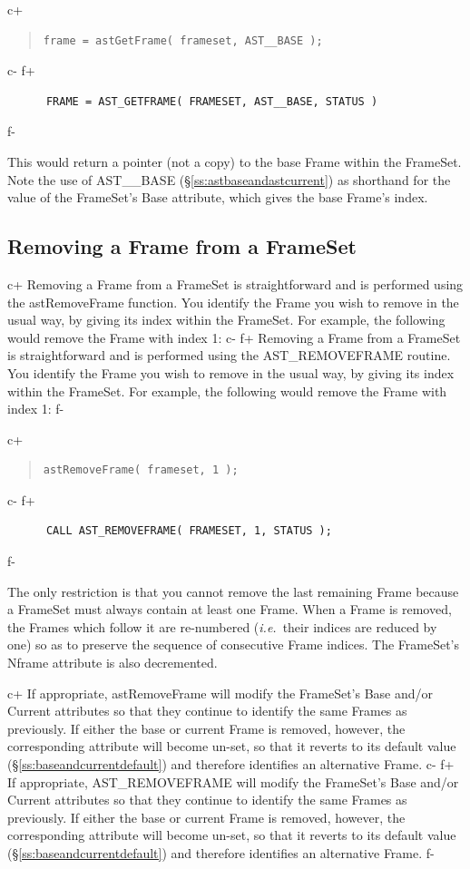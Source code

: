 \documentclass[twoside,11pt]{article}
\newcommand{\secref}[1]{\S\ref{#1}}
\newcommand{\secref}[1]{\ref{#1}}
\begin{document}
c+
\begin{quote}
\small
\begin{verbatim}
frame = astGetFrame( frameset, AST__BASE );
\end{verbatim}
\normalsize
\end{quote}
c-
f+
\small
\begin{verbatim}
      FRAME = AST_GETFRAME( FRAMESET, AST__BASE, STATUS )
\end{verbatim}
\normalsize
f-

This would return a pointer (not a copy) to the base Frame within the
FrameSet. Note the use of AST\_\_BASE
(\secref{ss:astbaseandastcurrent}) as shorthand for the value of the
FrameSet's Base attribute, which gives the base Frame's index.

\subsection{Removing a Frame from a FrameSet}

c+
Removing a Frame from a FrameSet is straightforward and is performed
using the astRemoveFrame function. You identify the Frame you wish to
remove in the usual way, by giving its index within the FrameSet. For
example, the following would remove the Frame with index 1:
c-
f+
Removing a Frame from a FrameSet is straightforward and is performed
using the AST\_REMOVEFRAME routine. You identify the Frame you wish to
remove in the usual way, by giving its index within the FrameSet. For
example, the following would remove the Frame with index 1:
f-

c+
\begin{quote}
\small
\begin{verbatim}
astRemoveFrame( frameset, 1 );
\end{verbatim}
\normalsize
\end{quote}
c-
f+
\small
\begin{verbatim}
      CALL AST_REMOVEFRAME( FRAMESET, 1, STATUS );
\end{verbatim}
\normalsize
f-

The only restriction is that you cannot remove the last remaining
Frame because a FrameSet must always contain at least one Frame.  When
a Frame is removed, the Frames which follow it are re-numbered
({\em{i.e.}}\ their indices are reduced by one) so as to preserve the
sequence of consecutive Frame indices.  The FrameSet's Nframe
attribute is also decremented.

c+
If appropriate, astRemoveFrame will modify the FrameSet's Base and/or
Current attributes so that they continue to identify the same Frames
as previously. If either the base or current Frame is removed,
however, the corresponding attribute will become un-set, so that it
reverts to its default value (\secref{ss:baseandcurrentdefault}) and
therefore identifies an alternative Frame.
c-
f+
If appropriate, AST\_REMOVEFRAME will modify the FrameSet's Base
and/or Current attributes so that they continue to identify the same
Frames as previously. If either the base or current Frame is removed,
however, the corresponding attribute will become un-set, so that it
reverts to its default value (\secref{ss:baseandcurrentdefault}) and
therefore identifies an alternative Frame.
f-
\end{document}
